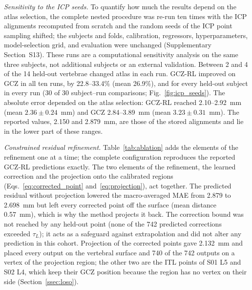 \documentclass[5p,times,twocolumn,authoryear]{elsarticle}
\begin{document}
\emph{Sensitivity to the ICP seeds.} To quantify how much the results depend on the atlas selection, the complete nested procedure was re-run ten times with the ICP alignments recomputed from scratch and the random seeds of the ICP point sampling shifted; the subjects and folds, calibration, regressors, hyperparameters, model-selection grid, and evaluation were unchanged (Supplementary Section~S13). These runs are a computational sensitivity analysis on the same three subjects, not additional subjects or an external validation. Between 2 and 4 of the 14 held-out vertebrae changed atlas in each run. GCZ-RL improved on GCZ in all ten runs, by 22.8--33.4\% (mean 26.9\%), and for every held-out subject in every run (30 of 30 subject--run comparisons; Fig.~\ref{fig:icp_seeds}). The absolute error depended on the atlas selection: GCZ-RL reached 2.10--2.92~mm (mean $2.36\pm0.24$~mm) and GCZ 2.84--3.89~mm (mean $3.23\pm0.31$~mm). The reported values, 2.150 and 2.879~mm, are those of the stored alignments and lie in the lower part of these ranges.

\emph{Constrained residual refinement.} Table~\ref{tab:ablation} adds the elements of the refinement one at a time; the complete configuration reproduces the reported GCZ-RL predictions exactly. The two elements of the refinement, the learned correction and the projection onto the calibrated regions (Eqs.~\eqref{eq:corrected_point} and~\eqref{eq:projection}), act together. The predicted residual without projection lowered the macro-averaged MAE from 2.879 to 2.698~mm but left every corrected point off the surface (mean distance 0.57~mm), which is why the method projects it back. The correction bound was not reached by any held-out point (none of the 742 predicted corrections exceeded $\tau_L$); it acts as a safeguard against extrapolation and did not alter any prediction in this cohort. Projection of the corrected points gave 2.132~mm and placed every output on the vertebral surface and 740 of the 742 outputs on a vertex of the projection region; the other two are the ITL points of S01 L5 and S02 L4, which keep their GCZ position because the region has no vertex on their side (Section~\ref{ssec:loso}).
\end{document}
